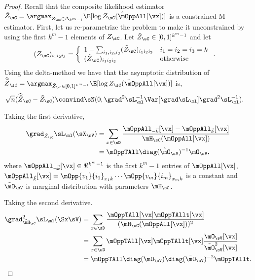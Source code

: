 \begin{proof}
  Recall that the composite likelihood estimator $\hat Z_\sC
  = \argmax_{Z_\sC \in \Delta_{k^m-1}} \hat\E[\log Z_\sC(\mOppAll[\vx])]$ is
  a constrained M-estimator.
  First, let us re-parametrize the problem to make it unconstrained by
  using the first $k^m - 1$ elements of $Z_\sC$.  
  Let $\tilde Z_\sC \in [0,1]^{k^m-1}$ and let 
  \begin{align*}
    (Z_\sC)_{i_1i_2i_3} &= \left\{
      \begin{array}{ll}
        1 - \sum_{i_1,i_2,i_3} (\tilde Z_\sC)_{i_1i_2i_3} & i_1 = i_2 = i_3 = k \\
        (\tilde Z_\sC)_{i_1i_2i_3} & \text{otherwise}
        \end{array}
        \right.
        .
  \end{align*}
  Using the delta-method \cite{vaart98asymptotic} we have that the asymptotic distribution of 
  $\widehat{{\tilde Z}}_\sC = \argmax_{\tilde Z_\sC \in [0,1]^{k^m-1}} \hat\E[\log Z_\sC(\mOppAll[\vx])]$ is,
  \begin{align*}
    \sqrt{n}(\widehat{\tilde{Z}}_{\sC} - \tilde{Z}_{\sC}) &\convind \sN( 0, \grad^2 \sL_\ml^{-1} \Var[\grad \sL_\ml] \grad^2 \sL_\ml^{-1}).
  \end{align*}

Taking the first derivative,
\begin{align}
  \grad_{\tilde Z_\sC} \sL_\ml(\sX_\sV) 
  &= \sum_{x \in \sD} \frac{\mOppAll_{\neg \vec k}[\vx] - \mOppAll_{\vec k}[\vx]}{\mH_\sC(\mOppAll[\vx]) } \nonumber \\ 
  &= \mOppTAll \diag(\tilde \mO_{\sV})^{-1} \mO_{\sV}, \label{eqn:lhood-grad}
\end{align}
where $\mOppAll_{\neg \vec k}[\vx] \in \Re^{k^m-1}$ is the first $k^m-1$
entries of $\mOppAll[\vx]$, $\mOppAll_{\vec k}[\vx] = \mOpp{v_1}{i_1}_{x_1k}
\cdots \mOpp{v_m}{i_m}_{x_mk}$ is a constant and $\tilde \mO_\sV$ is
marginal distribution with parameters $\mH_\sC$.

Taking the second derivative.
\begin{align}
  \grad^2_{\tilde \mH_\sC} \sL_\ml(\Sx \sV) 
  &= \sum_{x \in \sD} \frac{\mOppTAll[\vx] \mOppTAllt[\vx]}{(\mH_\sC(\mOppAll[\vx]))^2} \nonumber \\
  &= \sum_{x \in \sD}\mOppTAll[\vx] \mOppTAllt[\vx] \frac{\mO_{\sV}[\vx]}{\tilde \mO_{\sV}^2[\vx]} \nonumber \\
  &= \mOppTAll \diag(\mO_{\sV}) \diag(\tilde \mO_{\sV})^{-2} \mOppTAllt. \label{eqn:lhood-hess}%
\end{align}


\end{proof}
